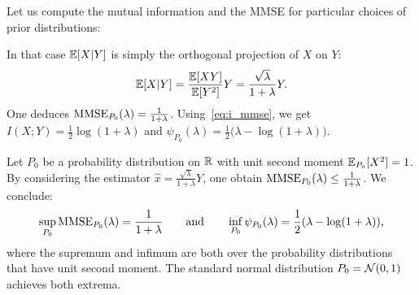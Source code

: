 \documentclass[12pt,nocut]{article}
\begin{document}

Let us compute the mutual information and the MMSE for particular choices of prior distributions:
\begin{example}[Gaussian prior: $P_0 = \cN(0,1)$]\label{ex:gaussian_psi}
			In that case $\mathbb{E}[X|Y]$ is simply the orthogonal projection of $X$ on $Y$: 
			$$
			\mathbb{E}[X|Y] = \frac{\mathbb{E}[XY]}{\mathbb{E}[Y^2]} Y = \frac{\sqrt{\lambda}}{1+\lambda} Y.
			$$
			One deduces ${{\rm MMSE}}_{P_0}(\lambda) = \frac{1}{1+\lambda}$.
			Using~\eqref{eq:i_mmse}, we get $I(X;Y) = \frac{1}{2} \log(1+\lambda)$ and $\psi_{P_0}(\lambda) = \frac{1}{2}\big(\lambda - \log(1+\lambda)\big)$.
\end{example}

\begin{remark}\label{rem:worst_case}
	Let $P_0$ be a probability distribution on $\mathbb{R}$ with unit second moment $\mathbb{E}_{P_0}[X^2] = 1$. By considering the estimator $\widehat{x} = \frac{\sqrt{\lambda}}{1+\lambda} Y$, one obtain ${{\rm MMSE}}_{P_0}(\lambda) \leq \frac{1}{1+ \lambda}$. We conclude:
	$$
	\sup_{P_0} {{\rm MMSE}}_{P_0}(\lambda) = \frac{1}{1+\lambda} \qquad \text{and} \qquad
	\inf_{P_0} \psi_{P_0}(\lambda) = \frac{1}{2}(\lambda - \log(1+\lambda)),
	$$
	where the supremum and infimum are both over the probability distributions that have unit second moment. The standard normal distribution $P_0 = \cN(0,1)$ achieves both extrema.
\end{remark}
\end{document}
